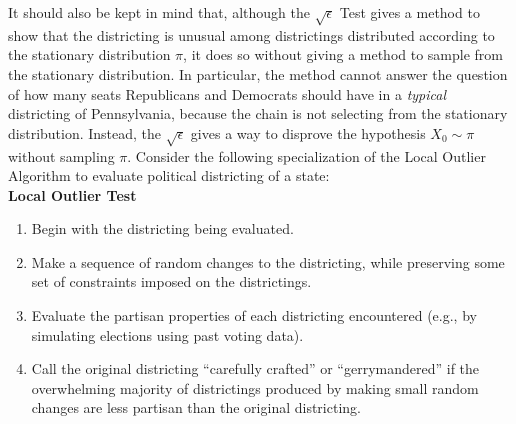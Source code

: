 \documentclass[12pt]{article}
\begin{document}
It should also be kept in mind that, although the \( \sqrt{\epsilon} \)
Test gives a method to show that the districting is unusual among
districtings distributed according to the stationary distribution \( \pi
\), it does so without giving a method to sample from the stationary
distribution.  In particular, the method cannot answer the question of
how many seats Republicans and Democrats should have in a \emph{typical}
districting of Pennsylvania, because the chain is not selecting from the
stationary distribution.  Instead, the \( \sqrt{\epsilon} \) gives a way
to disprove the hypothesis \( X_{0} \sim \pi \) without sampling \( \pi \).
Consider the following specialization of the Local Outlier Algorithm to
evaluate political districting of a state:\\
\textbf{Local Outlier Test}%
\begin{enumerate}
    \item
        Begin with the districting being evaluated.
    \item
        \label{enum:significance:mcstep} Make a sequence of random
        changes to the districting, while preserving some set of
        constraints imposed on the districtings.
    \item
        Evaluate the partisan properties of each districting encountered
        (e.g., by simulating elections using past voting data).
    \item
        \label{enum:significance:crafted} Call the original districting
        ``carefully crafted'' or ``gerrymandered'' if the overwhelming
        majority of districtings produced by making small random changes
        are less partisan than the original districting.
\end{enumerate}
\end{document}
